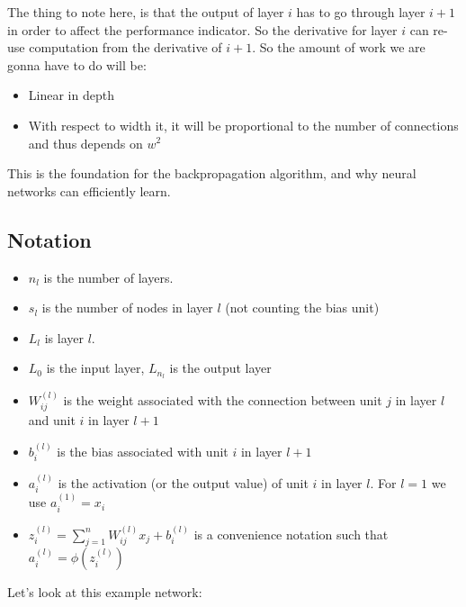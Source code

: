     The thing to note here, is that the output of layer $i$ has to go through 
    layer $i+1$ in order to affect the performance indicator. So the derivative 
    for layer $i$ can re-use computation from the derivative of $i+1$. So the 
    amount of work we are gonna have to do will be:
    \begin{itemize}
        \item Linear in depth
        \item With respect to width it, it will be proportional to the number 
        of connections and thus depends on $w^2$
    \end{itemize}
    
    This is the foundation for the backpropagation algorithm, and why neural 
    networks can efficiently learn.
    
    \subsection{Notation}
    \begin{itemize}
        \item $n_l$ is the number of layers.
        \item $s_l$ is the number of nodes in layer $l$ (not counting the bias 
        unit)
        \item $L_l$ is layer $l$.
        \item $L_0$ is the input layer, $L_{n_l}$ is the output layer
        \item $W_{ij}^{(l)}$ is the weight associated with the connection 
        between unit $j$ in layer $l$ and unit $i$ in layer $l+1$
        \item $b_i^{(l)}$ is the bias associated with unit $i$ in layer $l+1$
        \item $a_i^{(l)}$ is the activation (or the output value) of unit $i$ 
        in layer $l$. For $l=1$ we use $a_i^{(1)}=x_i$
        \item $z_i^{(l)}=\sum_{j=1}^{n}W_{ij}^{(l)}x_j+b_i^{(l)}$ is a 
        convenience notation such that $a_i^{(l)}=\phi(z_i^{(l)})$
    \end{itemize}
    
    Let's look at this example network:
    
